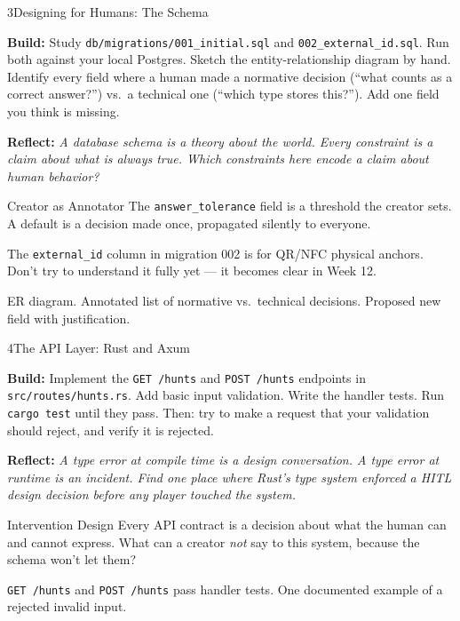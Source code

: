 \documentclass[
  11pt,
  oneside,
  DIV=12,
]{scrartcl}
\newcommand{\build}[1]{\textbf{\color{SpringMoss}Build:} #1}
\newcommand{\reflect}[1]{\textbf{\color{ConceptBlue}Reflect:} \textit{#1}}
\begin{document}
\begin{milestone}{3}{Designing for Humans: The Schema}

\build{Study \texttt{db/migrations/001\_initial.sql} and
\texttt{002\_external\_id.sql}. Run both against your local Postgres.
Sketch the entity-relationship diagram by hand. Identify every field where
a human made a normative decision (``what counts as a correct answer?'')
vs.\ a technical one (``which type stores this?''). Add one field you think
is missing.}

\medskip
\reflect{A database schema is a theory about the world. Every constraint is
a claim about what is always true. Which constraints here encode a claim
about human behavior?}

\begin{hitlconcept}{Creator as Annotator}
  The \texttt{answer\_tolerance} field is a threshold the creator sets.
  A default is a decision made once, propagated silently to everyone.
\end{hitlconcept}

\begin{hintbox}
  The \texttt{external\_id} column in migration 002 is for QR/NFC physical
  anchors. Don't try to understand it fully yet — it becomes clear in Week 12.
\end{hintbox}

\begin{checkpoint}
  ER diagram. Annotated list of normative vs.\ technical decisions.
  Proposed new field with justification.
\end{checkpoint}

\end{milestone}

\begin{milestone}{4}{The API Layer: Rust and Axum}

\build{Implement the \texttt{GET /hunts} and \texttt{POST /hunts} endpoints
in \texttt{src/routes/hunts.rs}. Add basic input validation. Write the
handler tests. Run \texttt{cargo test} until they pass. Then: try to make
a request that your validation should reject, and verify it is rejected.}

\medskip
\reflect{A type error at compile time is a design conversation. A type error
at runtime is an incident. Find one place where Rust's type system enforced
a HITL design decision before any player touched the system.}

\begin{hitlconcept}{Intervention Design}
  Every API contract is a decision about what the human can and cannot
  express. What can a creator \emph{not} say to this system, because the
  schema won't let them?
\end{hitlconcept}

\begin{checkpoint}
  \texttt{GET /hunts} and \texttt{POST /hunts} pass handler tests.
  One documented example of a rejected invalid input.
\end{checkpoint}

\end{milestone}
\end{document}
